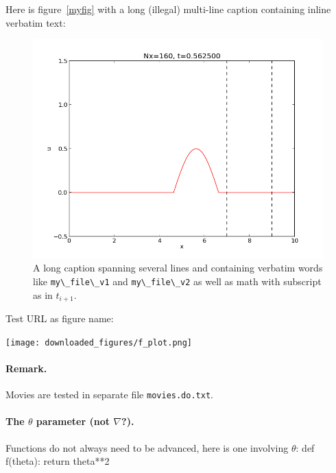 \documentclass[%
oneside,                 %
final,                   %
10pt]{article}
\theoremstyle{definition}
\begin{document}
\begin{enumerate}
\vspace{6mm}
Here is figure~\vref{myfig} with a long (illegal) multi-line caption
containing inline verbatim text:
\begin{figure}
  \centering
  \includegraphics[width=0.9\linewidth]{testfigs/wave1D.png}
  \caption{
  A long caption spanning several lines and containing verbatim words like \protect \Verb!my\_file\_v1! and \protect \Verb!my\_file\_v2! as well as math with subscript as in $t_{i+1}$. \label{myfig}
  }
\end{figure}
Test URL as figure name:
\vspace{6mm}
\centerline{\texttt{[image: downloaded\_figures/f\_plot.png]}}
\vspace{6mm}
\paragraph{Remark.}
Movies are tested in separate file \texttt{movies.do.txt}.
\paragraph{The $\theta$ parameter (not $\nabla$?).}
\label{decay:sec:theta}
Functions do not always need to be advanced, here is one
involving $\theta$:
\bccq
def f(theta):
    return theta**2

\eccq


\end{enumerate}
\end{document}
